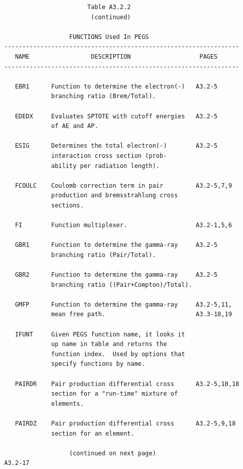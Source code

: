 \newpage {} \begin{verbatim}
                        Table A3.2.2
                         (continued)
 
                   FUNCTIONS Used In PEGS
 -----------------------------------------------------------------
    NAME                 DESCRIPTION                   PAGES
 -----------------------------------------------------------------
 
    EBR1      Function to determine the electron(-)   A3.2-5
              branching ratio (Brem/Total).
 
    EDEDX     Evaluates SPTOTE with cutoff energies   A3.2-5
              of AE and AP.
 
    ESIG      Determines the total electron(-)        A3.2-5
              interaction cross section (prob-
              ability per radiation length).
 
    FCOULC    Coulomb correction term in pair         A3.2-5,7,9
              production and bremsstrahlung cross
              sections.
 
    FI        Function multiplexer.                   A3.2-1,5,6
 
    GBR1      Function to determine the gamma-ray     A3.2-5
              branching ratio (Pair/Total).
 
    GBR2      Function to determine the gamma-ray     A3.2-5
              branching ratio ((Pair+Compton)/Total).
 
    GMFP      Function to determine the gamma-ray     A3.2-5,11,
              mean free path.                         A3.3-18,19
 
    IFUNT     Given PEGS function name, it looks it
              up name in table and returns the
              function index.  Used by options that
              specify functions by name.
 
    PAIRDR    Pair production differential cross      A3.2-5,10,18
              section for a "run-time" mixture of
              elements.
 
    PAIRDZ    Pair production differential cross      A3.2-5,9,18
              section for an element.
 
                   (continued on next page)
 A3.2-17 
\end{verbatim} 
